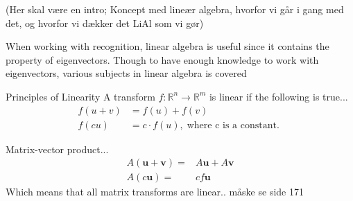 (Her skal være en intro; Koncept med lineær algebra, hvorfor vi går i gang med det, og hvorfor vi dækker det LiAl som vi gør)

When working with recognition, linear algebra is useful since it contains the property of eigenvectors. Though to have enough knowledge to work with eigenvectors, various subjects in linear algebra is covered

\begin{definition}{Principles of Linearity}
A transform $f: \mathbb{R}^n \rightarrow \mathbb{R}^m $ is linear if the following is true... 
\begin{align*}
f(u+v)&=f(u)+f(v)\\
f(c u)&=c \cdot f(u) , \; \text{where c is a constant. }
\label{def: Principles_of_Linearity}
\end{align*}

Matrix-vector product...
\begin{align*}
A(\textbf{u}+\textbf{v})=& A\textbf{u}+A\textbf{v}\\
A(c \textbf{u})=& c f\textbf{u}
\end{align*}
Which means that all matrix transforms are linear..
måske se side 171
\end{definition}

